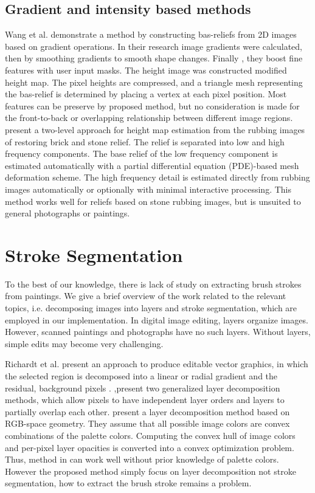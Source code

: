 \subsection{Gradient and intensity based methods}
Wang et al.\cite{wang2010image} demonstrate a method by constructing bas-reliefs from 2D images based on gradient operations. In their research image gradients were calculated, then by smoothing gradients to smooth shape changes. Finally , they boost fine features with user input masks.
The height image was constructed modified height map. The pixel heights are compressed, and a triangle mesh representing the bas-relief is determined by placing a vertex at each pixel position. Most features can be preserve by proposed method, but no consideration is made for the front-to-back or overlapping relationship between different image regions. \newline
\cite{li2012restoration} present a two-level approach for height map estimation from the rubbing images of restoring brick and stone relief.  The relief is separated into low and high frequency components. The base relief of the low frequency component is estimated automatically with a partial differential equation (PDE)-based mesh deformation scheme. The high frequency detail is estimated directly from rubbing images automatically or optionally with minimal interactive processing. This method works well for reliefs based on stone rubbing images, but is unsuited to general photographs or paintings.

\section{Stroke Segmentation}

To the best of our knowledge, there is lack of study on extracting brush strokes from paintings. We give a brief overview of the work related to the relevant topics, i.e. decomposing images into layers and stroke segmentation, which are employed in our implementation. In digital image editing, layers organize images. However, scanned paintings and photographs have no such layers. Without layers, simple edits may become very challenging.

Richardt et al.\cite{richardt2014vectorising} present an approach to produce editable vector graphics, in which the selected region is decomposed into a linear or radial gradient and the residual, background pixels . \cite{mccann2009local},\cite{mccann2012soft}present two generalized layer decomposition methods, which allow pixels to have independent layer orders and layers to partially overlap each other.\cite{tan2016decomposing} present a layer decomposition method based on RGB-space geometry. They assume that all possible image colors are convex combinations of the palette colors. Computing the convex hull of image colors and per-pixel layer opacities is converted into a convex optimization problem. Thus, method in \cite{tan2016decomposing} can work well without prior knowledge of palette colors. However the proposed method simply focus on layer decomposition not stroke segmentation, how to extract the brush stroke remains a problem. 

